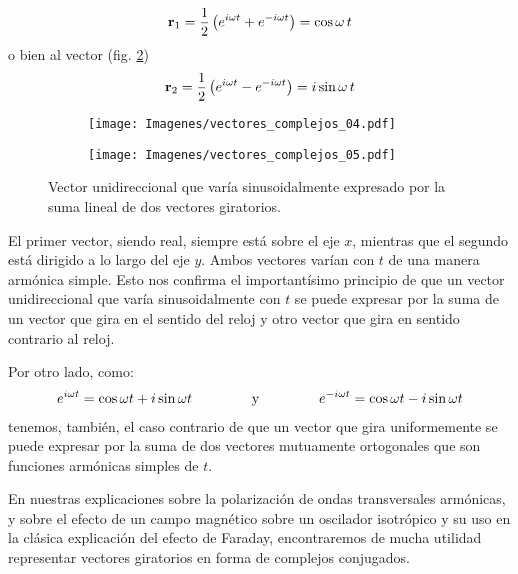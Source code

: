 \begin{align}
    \vb{r}_{1} = \dfrac{1}{2} \left( e^{i \omega t} + e^{- i \omega t} \right) = \cos \omega \, t
    \label{eq:ecuacion_01_91}
\end{align}
o bien al vector (fig. \ref{fig:figura_01_26b}) 
\begin{align}
    \vb{r}_{2} = \dfrac{1}{2} \left( e^{i \omega t} - e^{- i \omega t} \right) = i \sin \omega \, t
    \label{eq:ecuacion_01_92}
\end{align}
\begin{figure}[H]
    \centering
    \begin{subfigure}[t]{0.5\textwidth}
        \centering
        \texttt{[image: Imagenes/vectores\_complejos\_04.pdf]}
        \caption{}
        \label{fig:figura_01_26a}
    \end{subfigure}%
    \begin{subfigure}[t]{0.5\textwidth}
        \centering
        \texttt{[image: Imagenes/vectores\_complejos\_05.pdf]}
        \caption{}
        \label{fig:figura_01_26b}
    \end{subfigure}
    \caption{Vector unidireccional que varía sinusoidalmente expresado por la suma lineal de dos vectores giratorios.}
        \label{fig:figura_01_26}
\end{figure}
El primer vector, siendo real, siempre está sobre el eje $x$, mientras que el segundo está dirigido a lo largo del eje $y$. Ambos vectores varían con $t$ de una manera armónica simple. Esto nos confirma el importantísimo principio de que un vector unidireccional que varía sinusoidalmente con $t$ se puede expresar por la suma de un vector que gira en el sentido del reloj y otro vector que gira en sentido contrario al reloj. 
\par
Por otro lado, como:
\begin{align*}
    e^{i \omega t} = \cos \omega t + i \sin \omega t \hspace{1.5cm} \text{y} \hspace{1.5cm} e^{-i \omega t} = \cos \omega t - i \sin \omega t
\end{align*}
tenemos, también, el caso contrario de que un vector que gira uniformemente se puede expresar por la suma de dos vectores mutuamente ortogonales que son funciones armónicas simples de $t$.
\par
En nuestras explicaciones sobre la polarización de ondas transversales armónicas, y sobre el efecto de un campo magnético sobre un oscilador isotrópico y su uso en la clásica explicación del efecto de Faraday, encontraremos de mucha utilidad representar vectores giratorios en forma de complejos conjugados. 